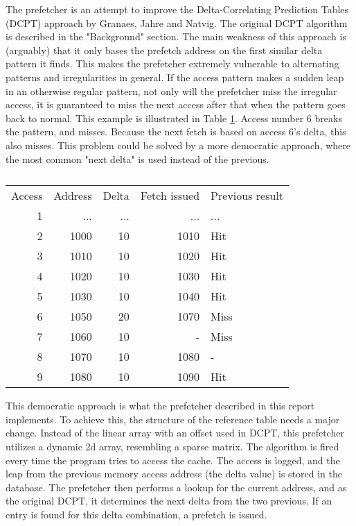 

The prefetcher is an attempt to improve the Delta-Correlating Prediction Tables (DCPT) approach by Granaes, Jahre and Natvig. The original DCPT algorithm is described in the "Background" section. The main weakness of this approach is (arguably) that it only bases the prefetch address on the first similar delta pattern it finds. This makes the prefetcher extremely vulnerable to alternating patterns and irregularities in general. If the access pattern makes a sudden leap in an otherwise regular pattern, not only will the prefetcher miss the irregular access, it is guaranteed to miss the next access after that when the pattern goes back to normal. This example is illustrated in Table \ref{table:breakDCPT}. Access number 6 breaks the pattern, and misses. Because the next fetch is based on access 6's delta, this also misses. This problem could be solved by a more democratic approach, where the most common "next delta" is used instead of the previous.
\begin{table}[!t]
\renewcommand{\arraystretch}{1.3}
\caption{}
\label{table:breakDCPT}
\centering
\begin{tabular}{rrrrl}
Access & Address & Delta & Fetch issued & Previous result\\
1 & ... & ... & ... & ...\\
2 & 1000 & 10 & 1010 & Hit\\
3 & 1010 & 10 & 1020 & Hit\\
4 & 1020 & 10 & 1030 & Hit\\
5 & 1030 & 10 & 1040 & Hit\\
6 & 1050 & 20 & 1070 & Miss\\
7 & 1060 & 10 & - 	 & Miss\\
8 & 1070 & 10 & 1080 & -\\
9 & 1080 & 10 & 1090 & Hit
\end{tabular}
\end{table}

This democratic approach is what the prefetcher described in this report implements. To achieve this, the structure of the reference table needs a major change. Instead of the linear array with an offset used in DCPT, this prefetcher utilizes a dynamic 2d array, resembling a sparse matrix. The algorithm is fired every time the program tries to access the cache. The access is logged, and the leap from the previous memory access address (the delta value) is stored in the database. The prefetcher then performs a lookup for the current address, and as the original DCPT, it determines the next delta from the two previous. If an entry is found for this delta combination, a prefetch is issued. 

